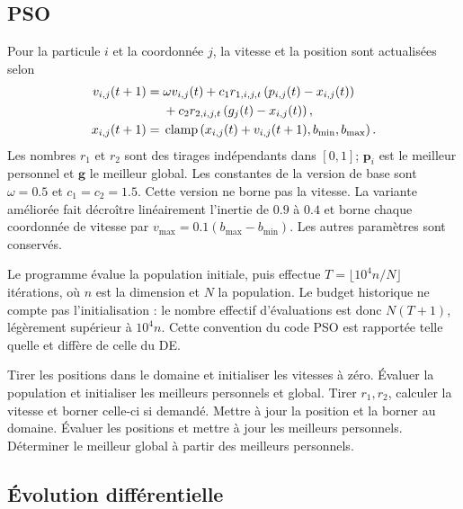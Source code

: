 \documentclass[conference]{IEEEtran}
\newcommand{\PSO}{\textsc{PSO}}
\newcommand{\DE}{\textsc{DE}}
\begin{document}
\subsection{PSO}
\label{sec:pso}

Pour la particule $i$ et la coordonnée $j$, la vitesse et la position sont
actualisées selon
\begin{align}
v_{i,j}(t+1)={}&\omega v_{i,j}(t)
+c_1r_{1,i,j,t}\left(p_{i,j}(t)-x_{i,j}(t)\right) \notag\\
&+c_2r_{2,i,j,t}\left(g_j(t)-x_{i,j}(t)\right),\\
x_{i,j}(t+1)={}&
\operatorname{clamp}\left(x_{i,j}(t)+v_{i,j}(t+1),b_{\min},b_{\max}\right).
\end{align}
Les nombres $r_1$ et $r_2$ sont des tirages indépendants dans $[0,1]$;
$\mathbf{p}_i$ est le meilleur personnel et $\mathbf{g}$ le meilleur global.
Les constantes de la version de base sont $\omega=0.5$ et $c_1=c_2=1.5$.
Cette version ne borne pas la vitesse. La variante améliorée fait décroître
linéairement l'inertie de $0.9$ à $0.4$ et borne chaque coordonnée de vitesse
par $v_{\max}=0.1(b_{\max}-b_{\min})$. Les autres paramètres sont conservés.

Le programme évalue la population initiale, puis effectue
$T=\lfloor10^4n/N\rfloor$ itérations, où $n$ est la dimension et $N$ la
population. Le budget historique ne compte pas l'initialisation : le nombre
effectif d'évaluations est donc $N(T+1)$, légèrement supérieur à $10^4n$.
Cette convention du code \PSO{} est rapportée telle quelle et diffère de celle
du \DE{}.

\begin{algorithm}[t]
\caption{Cycle \PSO{} séquentiel}
\label{alg:pso}
\begin{algorithmic}[1]
\STATE Tirer les positions dans le domaine et initialiser les vitesses à zéro.
\STATE Évaluer la population et initialiser les meilleurs personnels et global.
    \STATE Tirer $r_1,r_2$, calculer la vitesse et borner celle-ci si demandé.
    \STATE Mettre à jour la position et la borner au domaine.
  \ENDFOR
  \STATE Évaluer les positions et mettre à jour les meilleurs personnels.
  \STATE Déterminer le meilleur global à partir des meilleurs personnels.
\ENDFOR
\end{algorithmic}
\end{algorithm}

\subsection{Évolution différentielle}
\label{sec:de}
\end{document}
